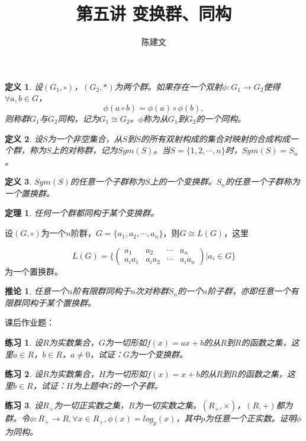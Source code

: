 \documentclass{article}
\newtheorem{Def}{定义}
\newtheorem{Thm}{定理}
\newtheorem{Exercise}{练习}
\newtheorem{Cor}{推论}
\begin{document}
\begin{CJK*}{UTF8}{gbsn}
  \title{第五讲 变换群、同构}
  \author{陈建文}
  \maketitle
  
  \begin{Def}
    设$(G_1,\circ)$，$(G_2,*)$为两个群。如果存在一个双射$\phi:G_1\to G_2$使得$\forall a,b\in G$，
    \[\phi(a\circ b)=\phi(a)\circ \phi(b),\]
    则称群$G_1$与$G_2$同构，记为$G_1\cong G_2$。$\phi$称为从$G_1$到$G_2$的一个同构。
  \end{Def}

  \begin{Def}
    设$S$为一个非空集合，从$S$到$S$的所有双射构成的集合对映射的合成构成一个群，称为$S$上的对称群，记为$Sym(S)$。当$S=\{1,2,\cdots,n\}$时，$Sym(S)=S_n$。
  \end{Def}

\begin{Def}
  $Sym(S)$的任意一个子群称为$S$上的一个变换群。$S_n$的任意一个子群称为一个置换群。
\end{Def}

\begin{Thm}
  任何一个群都同构于某个变换群。
\end{Thm}

设$(G,\circ)$为一个$n$阶群，$G=\{a_1,a_2,\cdots,a_n\}$，则$G\cong L(G)$，这里

\[L(G)=\Big\{\begin{pmatrix}a_1&a_2&\cdots&a_n\\a_ia_1&a_ia_2&\cdots&a_ia_n\end{pmatrix}|a_i\in G\Big\}\]
为一个置换群。
\begin{Cor}
  任意一个$n$阶有限群同构于$n$次对称群$S_n$的一个$n$阶子群，亦即任意一个有限群同构于某个置换群。
\end{Cor}
课后作业题：
\begin{Exercise}
设$R$为实数集合，$G$为一切形如$f(x)=ax+b$的从$R$到$R$的函数之集，这里$a\in R$，$b\in R$，$a\neq 0$，试证：$G$为一个变换群。
\end{Exercise}

\begin{Exercise}
  设$R$为实数集合，$H$为一切形如$f(x)=x+b$的从$R$到$R$的函数之集，这里$b\in R$，试证：$H$为上题中$G$的一个子群。
\end{Exercise}
\begin{Exercise}
设$R_+$为一切正实数之集，$R$为一切实数之集。$(R_+,\times)$，$(R,+)$都为群。令$\phi:R_+\to R,\forall x\in R_+,\phi(x)=log_p(x)$，其中$p$为任意一个正实数。证明$\phi$为同构。
\end{Exercise}
\end{CJK*}
\end{document}
